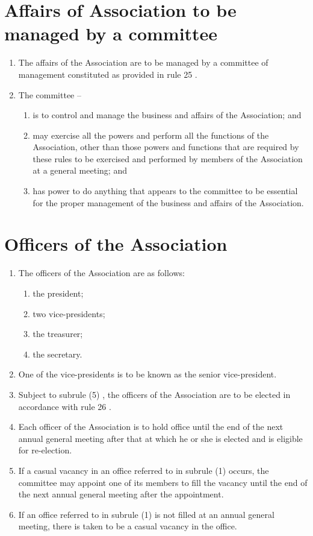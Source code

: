 \documentclass[a4paper,11pt]{article}
\begin{document}
\section{Affairs of Association to be managed by a committee}
\begin{enumerate}
	\item The affairs of the Association are to be managed by a committee of management constituted as provided in rule 25 .

	\item The committee --
	\begin{enumerate}
		\item is to control and manage the business and affairs of the Association; and
		\item may exercise all the powers and perform all the functions of the Association, other than those powers and functions that are required by these rules to be exercised and performed by members of the Association at a general meeting; and
		\item has power to do anything that appears to the committee to be essential for the proper management of the business and affairs of the Association.
	\end{enumerate}
\end{enumerate}

\section{Officers of the Association}
\begin{enumerate}
	\item The officers of the Association are as follows:
	\begin{enumerate}
		\item the president;
		\item two vice-presidents;
		\item the treasurer;
		\item the secretary.
	\end{enumerate}
	
	\item One of the vice-presidents is to be known as the senior vice-president.
	\item Subject to subrule (5) , the officers of the Association are to be elected in accordance with rule 26 .
	\item Each officer of the Association is to hold office until the end of the next annual general meeting after that at which he or she is elected and is eligible for re-election.
	\item If a casual vacancy in an office referred to in subrule (1) occurs, the committee may appoint one of its members to fill the vacancy until the end of the next annual general meeting after the appointment.
	\item If an office referred to in subrule (1) is not filled at an annual general meeting, there is taken to be a casual vacancy in the office.
\end{enumerate}
\end{document}

